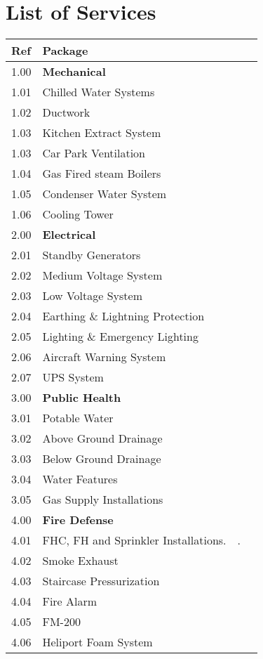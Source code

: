 \section{List of Services}
\label{chap:listofservices}

\begin{longtable}{lll@{}l@{}}
\toprule
Ref	&Package	&	&\\
\midrule
1.00	&\textbf{Mechanical}	&	&\\
1.01	&Chilled Water Systems	&	&\\
1.02	&Ductwork  &		&\\
1.03    &Kitchen Extract System &&\\
1.03	&Car Park Ventilation 	&&\\
1.04	&Gas Fired steam Boilers &&		\\
1.05	&Condenser Water System 	&&     \\
1.06    &Cooling Tower &&  \\
\midrule
2.00	&\textbf{Electrical}		&&\\
2.01	&Standby Generators	&&\\	
2.02	&Medium Voltage System	&&\\	
2.03	&Low Voltage System		&&\\
2.04	&Earthing \& Lightning Protection &&\\		
2.05	&Lighting \& Emergency Lighting  &&\\		
2.06	&Aircraft Warning System &&\\		
2.07	&UPS System	&&\\	
\midrule
3.00	&\textbf{Public Health}		&&\\
3.01	&Potable Water	&&\\	
3.02	&Above Ground Drainage &&\\		
3.03	&Below Ground Drainage  &&\\		
3.04	&Water Features	     &&\\	
3.05	&Gas Supply Installations	&&\\	
\midrule		
4.00	&\textbf{Fire Defense} &&\\	
4.01	&FHC, FH and Sprinkler Installations.	&.&\\	
4.02	&Smoke Exhaust		&&\\
4.03	&Staircase Pressurization          &&\\		
4.04	&Fire Alarm		&&\\
4.05	&FM-200		&&\\
4.06	&Heliport Foam System	 &&\\	

\end{longtable}
